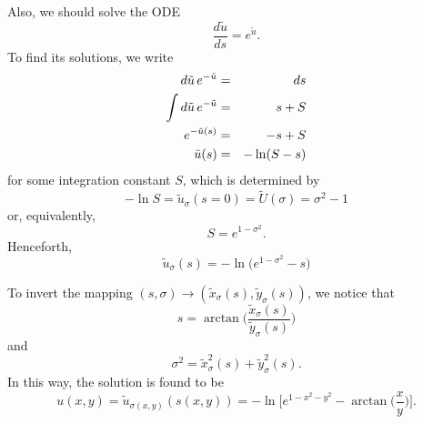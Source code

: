 \documentclass[11pt,spanish]{article}
\begin{document}
Also, we should solve the ODE
$$
\frac{d\tilde u}{ds}
=
e^{\tilde u}.
$$
To find its solutions, we write
\begin{eqnarray}
d\tilde u\, e^{-\tilde u}
&=&
ds
\notag
\\
\int d\tilde u\,e^{-\tilde u}
&=&
s + S
\notag
\\
e^{-\tilde u(s)}
&=&
-s + S
\notag
\\
\tilde u(s)
&=&
-\ln(S-s)
\notag
\end{eqnarray}
for some integration constant $S$, which is determined by
$$
-\ln S
=
\tilde u_{\sigma}(s=0)
=
\tilde U(\sigma)
=
\sigma^2-1
$$
or, equivalently,
$$
S = e^{1-\sigma^2}.
$$
Henceforth,
$$
\tilde u_{\sigma}(s)
=
-
\ln
\big(
e^{1-\sigma^2}
-
s
\big)
$$

To invert the mapping $(s,\sigma)\to (\tilde x_{\sigma}(s),\tilde y_{\sigma}(s))$, we notice that
$$
s 
= 
\arctan
\bigg(
\frac{\tilde x_{\sigma}(s)}{\tilde y_{\sigma}(s)}
\bigg)
$$
and
$$
\sigma^2
=
\tilde x_{\sigma}^2(s)
+
\tilde y_{\sigma}^2(s).
$$
In this way, the solution is found to be
$$
u(x,y)
=
\tilde u_{\sigma(x,y)}(s(x,y))
=
-\ln
\bigg[
e^{1-x^2-y^2}
-
\arctan\bigg(\frac{x}{y}\bigg)
\bigg]
.
$$
\end{document}
